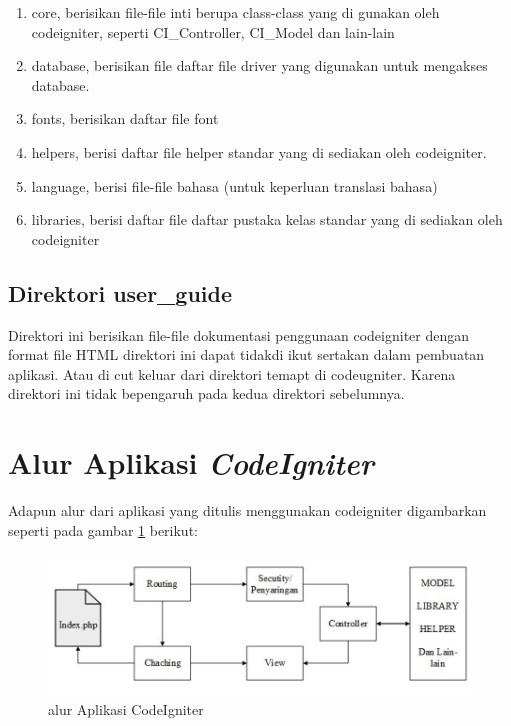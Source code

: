 \begin{enumerate}
\item core, berisikan file-file inti berupa class-class yang di gunakan oleh codeigniter, seperti CI\_Controller, CI\_Model dan lain-lain
\item database, berisikan file daftar file driver yang digunakan untuk mengakses database.
\item fonts, berisikan daftar file font 
\item helpers, berisi daftar file helper standar yang di sediakan oleh codeigniter.
\item language, berisi file-file bahasa (untuk keperluan translasi bahasa)
\item libraries, berisi daftar file daftar pustaka kelas standar yang di sediakan oleh codeigniter
\end{enumerate}

\subsection{Direktori user\_guide}
Direktori ini berisikan file-file dokumentasi penggunaan codeigniter dengan format file HTML direktori ini dapat tidakdi ikut sertakan dalam pembuatan aplikasi. Atau di cut keluar dari direktori temapt di codeugniter. Karena direktori ini tidak bepengaruh pada kedua direktori sebelumnya.

\section{Alur Aplikasi \textit{CodeIgniter}}

Adapun alur dari aplikasi yang ditulis menggunakan codeigniter digambarkan seperti pada gambar \ref{C9} berikut:\par
\begin{figure}[!htbp]
	\centerline{\includegraphics[width=1\textwidth]{figures/ci/9.png}}
	\caption{alur Aplikasi CodeIgniter}
	\label{C9}
\end{figure}

